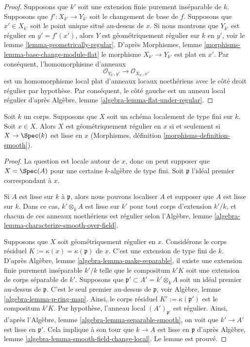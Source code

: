 \begin{proof}
Supposons que $k'$ soit une extension finie purement
inséparable de $k$. Supposons que $f' : X_{k'} \to
Y_{k'}$ soit le changement de base de $f$. Supposons que
$x' \in X_{k'}$ soit le point unique situé au-dessus de
$x$. Si nous montrons que $Y_{k'}$ est régulier en $y' =
f'(x')$, alors $Y$ est géométriquement régulier sur $k$
en $y'$, voir le lemme
\ref{lemma-geometrically-regular}. D'après Morphismes, lemme
\ref{morphisms-lemma-base-change-module-flat} le morphisme $X_{k'}
\to Y_{k'}$ est plat en $x'$. Par conséquent, l'homomorphisme d'anneaux
$$
\mathcal{O}_{Y_{k'}, y'}
\longrightarrow
\mathcal{O}_{X_{k'}, x'}
$$
est un homomorphisme local plat d'anneaux locaux
noethériens avec le côté droit régulier par hypothèse. Par
conséquent, le côté gauche est un anneau local régulier
d'après Algèbre, lemme \ref{algebra-lemma-flat-under-regular}.
\end{proof}

\begin{lemma}
\label{lemma-geometrically-regular-smooth}
Soit $k$ un corps. Supposons que $X$
soit un schéma localement de type fini sur $k$. Soit $x
\in X$. Alors $X$ est géométriquement régulier en $x$
si et seulement si $X \to \Spec(k)$ est lisse en $x$
(Morphismes, définition \ref{morphisms-definition-smooth}).
\end{lemma}

\begin{proof}
La question est locale autour de $x$, donc
on peut supposer que $X = \Spec(A)$
pour une certaine $k$-algèbre de type fini.
Soit $\mathfrak p$ l'idéal premier correspondant à $x$.

\medskip\noindent
Si $A$ est lisse sur $k$ à $\mathfrak p$, alors nous pouvons
localiser $A$ et supposer que $A$ est lisse sur $k$. Dans ce cas,
$k' \otimes_k A$ est lisse sur $k'$ pour tout corps d'extension
$k'/k$, et chacun de ces anneaux noethériens est régulier selon
l'Algèbre, lemme \ref{algebra-lemma-characterize-smooth-over-field}.

\medskip\noindent
Supposons que $X$ soit géométriquement régulier en $x$.
Considérons le corps résiduel $K := \kappa(x) =
\kappa(\mathfrak p)$ de $x$. C'est une extension de type
fini de $k$. D'après Algèbre, lemme
\ref{algebra-lemma-make-separable}, il existe une
extension finie purement inséparable $k'/k$ telle que le
compositum $k'K$ soit une extension de corps séparable de
$k'$. Supposons que $\mathfrak p' \subset A' = k'
\otimes_k A$ soit un idéal premier au-dessus de $\mathfrak
p$. C'est le seul premier au-dessus de $\mathfrak p$, voir
Algèbre, lemme \ref{algebra-lemma-p-ring-map}. Ainsi, le
corps résiduel $K' := \kappa(\mathfrak p')$ est le
compositum $k'K$. Par hypothèse, l'anneau local
$(A')_{\mathfrak p'}$ est régulier. Ainsi, d'après l'Algèbre,
lemme \ref{algebra-lemma-separable-smooth}, on voit que $k'
\to A'$ est lisse en $\mathfrak p'$. Cela implique à son tour
que $k \to A$ est lisse en $\mathfrak p$ d'après Algèbre, lemme
\ref{algebra-lemma-smooth-field-change-local}. Le lemme est prouvé.
\end{proof}


